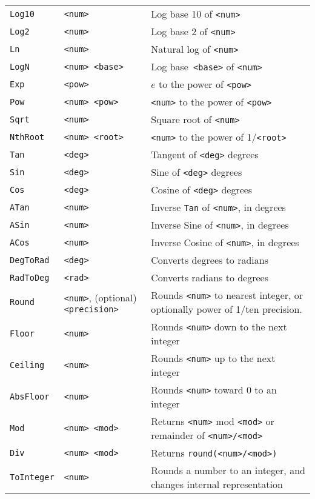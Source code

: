 \begin{longtable}{p{3cm}p{3cm}p{6cm}}
\midrule
\verb+Log10+ &\verb+<num>+ &Log base 10 of \verb+<num>+\\ 
\verb+Log2+ &\verb+<num>+ &Log base 2 of \verb+<num>+ \\ 
\verb+Ln+ &\verb+<num>+ &Natural log of \verb+<num>+\\ 
\verb+LogN+ &\verb+<num> <base>+ &Log base\verb+ <base>+ of \verb+<num>+\\ 
\verb+Exp+ &\verb+<pow>+ &$e$ to the power of \verb+<pow>+ \\ 
\verb+Pow+ &\verb+<num> <pow>+ &\verb+<num>+ to the power of \verb+<pow>+\\ 
\verb+Sqrt+ &\verb+<num>+ &Square root of \verb+<num>+\\ 
\verb+NthRoot+ &\verb+<num> <root>+ &\verb+<num>+ to the power of 1/\verb+<root>+\\ 
\verb+Tan+ &\verb+<deg>+ &Tangent of \verb+<deg>+ degrees \\ 
\verb+Sin+ &\verb+<deg>+ &Sine of \verb+<deg>+ degrees \\ 
\verb+Cos+ &\verb+<deg>+ &Cosine of \verb+<deg>+ degrees \\ 
\verb+ATan+ &\verb+<num>+ &Inverse \verb+Tan+ of \verb+<num>+, in degrees\\ 
\verb+ASin+ &\verb+<num>+ &Inverse Sine of \verb+<num>+, in degrees\\ 
\verb+ACos+ &\verb+<num>+ &Inverse Cosine of \verb+<num>+, in degrees\\ 
\verb+DegToRad+ &\verb+<deg>+ &Converts degrees to radians\\ 
\verb+RadToDeg+ &\verb+<rad>+ &Converts radians to degrees\\ 
\verb+Round+ &\verb+<num>+, (optional) \verb+<precision>+ &Rounds \verb+<num>+ to nearest integer, or optionally power of 1/ten precision.\\ 
\verb+Floor+ &\verb+<num>+ &Rounds \verb+<num>+ down to the next integer\\ 
\verb+Ceiling+ &\verb+<num>+ &Rounds \verb+<num>+ up to the next integer\\ 
\verb+AbsFloor+ &\verb+<num>+ &Rounds \verb+<num>+ toward 0 to an integer\\ 
\verb+Mod+ &\verb+<num> <mod>+ &Returns \verb+<num>+ mod \verb+<mod>+ or remainder of \verb+<num>/<mod>+ \\ 
\verb+Div+ &\verb+<num> <mod>+ &Returns \verb+round(<num>/<mod>)+ \\ 
\verb+ToInteger+ &\verb+<num>+ &Rounds a number to an integer, and changes internal representation\\ 

\end{longtable}

